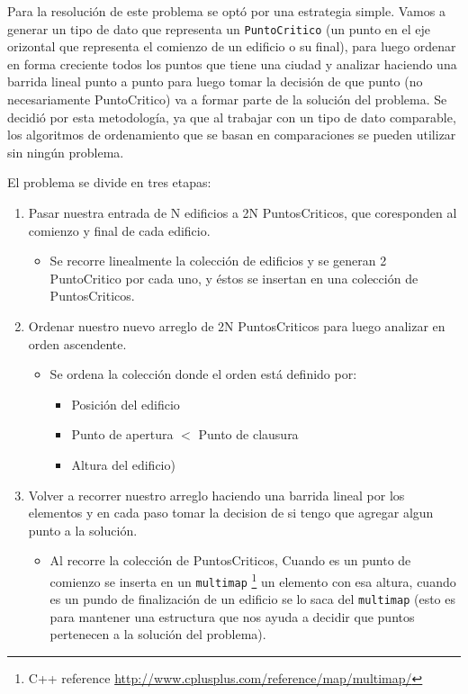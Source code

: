 Para la resolución de este problema se optó por una estrategia simple. Vamos a generar un tipo de dato que representa un \texttt{PuntoCritico} (un punto en el eje orizontal que representa el comienzo de un edificio o su final), para luego ordenar en forma creciente todos los puntos que tiene una ciudad y analizar haciendo una barrida lineal punto a punto para luego tomar la decisi\'on de que punto (no necesariamente PuntoCritico) va a formar parte de la solución del problema.
Se decidió por esta metodología, ya que al trabajar con un tipo de dato comparable, los algoritmos de ordenamiento que se basan en comparaciones se pueden utilizar sin ningún problema.

El problema se divide en tres etapas:

\begin{enumerate}[I]
	\item Pasar nuestra entrada de N edificios a 2N PuntosCriticos, que coresponden al comienzo y final de cada edificio.
		\begin{itemize}
		\item  Se recorre linealmente la colección de edificios y se generan 2 PuntoCritico por cada uno, y \'estos se insertan en una colección de PuntosCriticos.
		\end{itemize}
	\item Ordenar nuestro nuevo arreglo de 2N PuntosCriticos para luego analizar en orden ascendente.
		\begin{itemize}
		\item  Se ordena la colecci\'on donde el orden está definido por:  
			\begin{itemize}
				\item Posici\'on del edificio
				\item Punto de apertura $<$ Punto de clausura
				\item Altura del edificio)
			\end{itemize}
		\end{itemize}
	\item Volver a recorrer nuestro arreglo haciendo una barrida lineal por los elementos y en cada paso tomar la decision de si tengo que agregar algun punto a la soluci\'on.
	\begin{itemize}
		\item  Al recorre la colección de PuntosCriticos, Cuando es un punto de comienzo se inserta en un \texttt{multimap} \footnote{C++ reference \url{http://www.cplusplus.com/reference/map/multimap/}}  un elemento con esa altura, cuando es un pundo de finalizaci\'on de un edificio se lo saca del \texttt{multimap} (esto es para mantener una estructura que nos ayuda a decidir que puntos pertenecen a la soluci\'on del problema).
		\end{itemize}
\end{enumerate}

